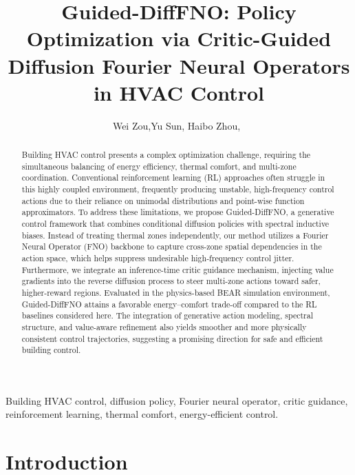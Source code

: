 \documentclass[lettersize,journal]{IEEEtran}
\theoremstyle{nonumberplain}     \theoremheaderfont{\bfseries\itshape}     \theorembodyfont{\normalfont}     \theoremseparator{:}     \theoremsymbol{\ensuremath{\blacksquare}}     \newtheorem{proof}{Proof}
\theoremstyle{plain}     \theoremheaderfont{\bfseries\itshape}     \theorembodyfont{\normalfont}     \theoremseparator{:}     \theoremsymbol{\ensuremath{\blacksquare}}     \newtheorem{remark}{Remark}
\begin{document}
\title{Guided-DiffFNO: Policy Optimization via Critic-Guided Diffusion Fourier Neural Operators in HVAC Control
}

\author{Wei Zou,Yu Sun, Haibo Zhou,~}

\maketitle

\begin{abstract}
Building HVAC control presents a complex optimization challenge, requiring the simultaneous balancing of energy efficiency, thermal comfort, and multi-zone coordination. Conventional reinforcement learning (RL) approaches often struggle in this highly coupled environment, frequently producing unstable, high-frequency control actions due to their reliance on unimodal distributions and point-wise function approximators. To address these limitations, we propose Guided-DiffFNO, a generative control framework that combines conditional diffusion policies with spectral inductive biases. Instead of treating thermal zones independently, our method utilizes a Fourier Neural Operator (FNO) backbone to capture cross-zone spatial dependencies in the action space, which helps suppress undesirable high-frequency control jitter. Furthermore, we integrate an inference-time critic guidance mechanism, injecting value gradients into the reverse diffusion process to steer multi-zone actions toward safer, higher-reward regions. Evaluated in the physics-based BEAR simulation environment, Guided-DiffFNO attains a favorable energy--comfort trade-off compared to the RL baselines considered here. The integration of generative action modeling, spectral structure, and value-aware refinement also yields smoother and more physically consistent control trajectories, suggesting a promising direction for safe and efficient building control.
\end{abstract}

\begin{IEEEkeywords}
Building HVAC control, diffusion policy, Fourier neural operator, critic guidance, reinforcement learning, thermal comfort, energy-efficient control.
\end{IEEEkeywords}

\section{Introduction}
\end{document}
